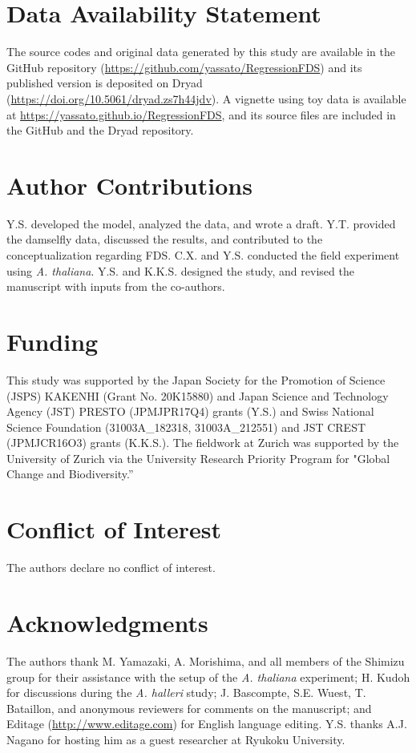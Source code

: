 \documentclass[12pt,]{article}
\begin{document}
\section*{Data Availability Statement}
The source codes and original data generated by this study are available in the GitHub repository (\url{https://github.com/yassato/RegressionFDS}) and its published version is deposited on Dryad (\url{https://doi.org/10.5061/dryad.zs7h44jdv}). A vignette using toy data is available at \url{https://yassato.github.io/RegressionFDS}, and its source files are included in the GitHub and the Dryad repository.

\section*{Author Contributions}
Y.S. developed the model, analyzed the data, and wrote a draft. Y.T. provided the damselfly data, discussed the results, and contributed to the conceptualization regarding FDS. C.X. and Y.S. conducted the field experiment using \textit{A. thaliana}. Y.S. and K.K.S. designed the study, and revised the manuscript with inputs from the co-authors.

\section*{Funding}
This study was supported by the Japan Society for the Promotion of Science (JSPS) KAKENHI (Grant No. 20K15880) and Japan Science and Technology Agency (JST) PRESTO (JPMJPR17Q4) grants (Y.S.) and Swiss National Science Foundation (31003A\_182318, 31003A\_212551) and JST CREST (JPMJCR16O3) grants (K.K.S.). The fieldwork at Zurich was supported by the University of Zurich via the University Research Priority Program for "Global Change and Biodiversity.”

\section*{Conflict of Interest}
The authors declare no conflict of interest.

\section*{Acknowledgments}
The authors thank M. Yamazaki, A. Morishima, and all members of the Shimizu group for their assistance with the setup of the \textit{A. thaliana} experiment; H. Kudoh for discussions during the \textit{A. halleri} study; J. Bascompte, S.E. Wuest, T. Bataillon, and anonymous reviewers for comments on the manuscript; and Editage (\url{http://www.editage.com}) for English language editing. Y.S. thanks A.J. Nagano for hosting him as a guest researcher at Ryukoku University. 
\end{document}

